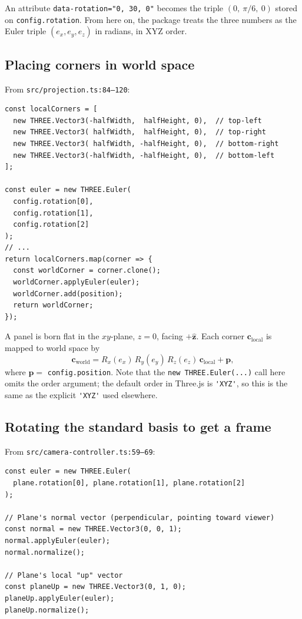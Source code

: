 \documentclass{article}
\begin{document}
\noindent An attribute \texttt{data-rotation="0, 30, 0"} becomes the triple
$(0,\ \pi/6,\ 0)$ stored on \lstinline|config.rotation|. From here on,
the package treats the three numbers as the Euler triple
$(e_x, e_y, e_z)$ in radians, in XYZ order.

\subsection{Placing corners in world space}

From \texttt{src/projection.ts:84--120}:

\begin{lstlisting}[caption={projection.ts: getPlaneWorldCorners (excerpt)}]
const localCorners = [
  new THREE.Vector3(-halfWidth,  halfHeight, 0),  // top-left
  new THREE.Vector3( halfWidth,  halfHeight, 0),  // top-right
  new THREE.Vector3( halfWidth, -halfHeight, 0),  // bottom-right
  new THREE.Vector3(-halfWidth, -halfHeight, 0),  // bottom-left
];

const euler = new THREE.Euler(
  config.rotation[0],
  config.rotation[1],
  config.rotation[2]
);
// ...
return localCorners.map(corner => {
  const worldCorner = corner.clone();
  worldCorner.applyEuler(euler);
  worldCorner.add(position);
  return worldCorner;
});
\end{lstlisting}

\noindent A panel is born flat in the $xy$-plane, $z=0$, facing
$+\hat{\mathbf{z}}$. Each corner $\mathbf{c}_\text{local}$ is mapped to
world space by
\begin{equation*}
\mathbf{c}_\text{world} = R_x(e_x)\,R_y(e_y)\,R_z(e_z)\,\mathbf{c}_\text{local} + \mathbf{p},
\end{equation*}
where $\mathbf{p} = $ \lstinline|config.position|. Note that the
\lstinline|new THREE.Euler(...)| call here omits the order argument; the
default order in Three.js is \lstinline|'XYZ'|, so this is the same as the
explicit \lstinline|'XYZ'| used elsewhere.

\subsection{Rotating the standard basis to get a frame}

From \texttt{src/camera-controller.ts:59--69}:

\begin{lstlisting}[caption={camera-controller.ts: calculatePerpendicularState (excerpt)}]
const euler = new THREE.Euler(
  plane.rotation[0], plane.rotation[1], plane.rotation[2]
);

// Plane's normal vector (perpendicular, pointing toward viewer)
const normal = new THREE.Vector3(0, 0, 1);
normal.applyEuler(euler);
normal.normalize();

// Plane's local "up" vector
const planeUp = new THREE.Vector3(0, 1, 0);
planeUp.applyEuler(euler);
planeUp.normalize();
\end{lstlisting}
\end{document}
